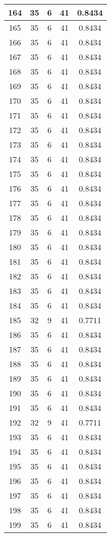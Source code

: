\documentclass[letterpaper, 12pt]{article}
\begin{document}
\begin{longtable}{|c|c|c|c|c|}
\hline
164 & 35 & 6 & 41 & 0.8434 \\
\hline
165 & 35 & 6 & 41 & 0.8434 \\
\hline
166 & 35 & 6 & 41 & 0.8434 \\
\hline
167 & 35 & 6 & 41 & 0.8434 \\
\hline
168 & 35 & 6 & 41 & 0.8434 \\
\hline
169 & 35 & 6 & 41 & 0.8434 \\
\hline
170 & 35 & 6 & 41 & 0.8434 \\
\hline
171 & 35 & 6 & 41 & 0.8434 \\
\hline
172 & 35 & 6 & 41 & 0.8434 \\
\hline
173 & 35 & 6 & 41 & 0.8434 \\
\hline
174 & 35 & 6 & 41 & 0.8434 \\
\hline
175 & 35 & 6 & 41 & 0.8434 \\
\hline
176 & 35 & 6 & 41 & 0.8434 \\
\hline
177 & 35 & 6 & 41 & 0.8434 \\
\hline
178 & 35 & 6 & 41 & 0.8434 \\
\hline
179 & 35 & 6 & 41 & 0.8434 \\
\hline
180 & 35 & 6 & 41 & 0.8434 \\
\hline
181 & 35 & 6 & 41 & 0.8434 \\
\hline
182 & 35 & 6 & 41 & 0.8434 \\
\hline
183 & 35 & 6 & 41 & 0.8434 \\
\hline
184 & 35 & 6 & 41 & 0.8434 \\
\hline
185 & 32 & 9 & 41 & 0.7711 \\
\hline
186 & 35 & 6 & 41 & 0.8434 \\
\hline
187 & 35 & 6 & 41 & 0.8434 \\
\hline
188 & 35 & 6 & 41 & 0.8434 \\
\hline
189 & 35 & 6 & 41 & 0.8434 \\
\hline
190 & 35 & 6 & 41 & 0.8434 \\
\hline
191 & 35 & 6 & 41 & 0.8434 \\
\hline
192 & 32 & 9 & 41 & 0.7711 \\
\hline
193 & 35 & 6 & 41 & 0.8434 \\
\hline
194 & 35 & 6 & 41 & 0.8434 \\
\hline
195 & 35 & 6 & 41 & 0.8434 \\
\hline
196 & 35 & 6 & 41 & 0.8434 \\
\hline
197 & 35 & 6 & 41 & 0.8434 \\
\hline
198 & 35 & 6 & 41 & 0.8434 \\
\hline
199 & 35 & 6 & 41 & 0.8434 \\
\hline
\end{longtable}
\end{document}

